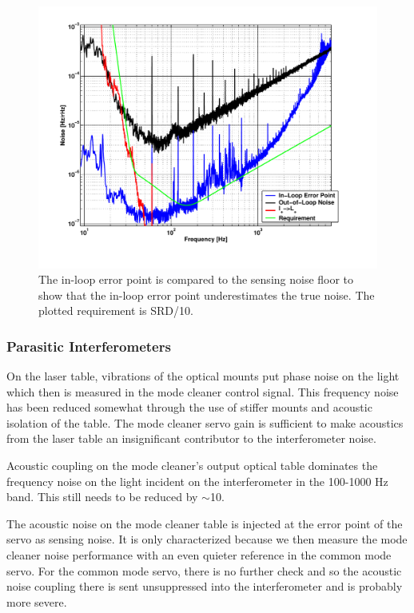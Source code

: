 \begin{figure}[!h]
\centerline{\includegraphics[angle=0,width=6.5in]{Figures/Chap5/cmnoise3b.pdf}}
\caption[Residual Frequency Noise]{The in-loop error point is compared to the
           sensing noise floor to show that the in-loop error point 
           underestimates the true noise. The plotted requirement is SRD/10.}
\label{fig:CMnoise}
\end{figure}

\subsubsection{Parasitic Interferometers}
\label{sec:CMscatter}

On the laser table, vibrations of the optical mounts put phase noise on the light
which then is measured in the mode cleaner control signal. This frequency noise
has been reduced somewhat through the use of stiffer mounts and acoustic isolation
of the table. The mode cleaner servo gain is sufficient to make acoustics from the
laser table an insignificant contributor to the interferometer noise.

Acoustic coupling on the mode cleaner's output optical table dominates the
frequency noise on the light incident on the interferometer in the 100-1000 Hz
band. This still needs to be reduced by $\sim$10.

The acoustic noise on the mode cleaner table is injected at the error point
of the servo as sensing noise. It is only characterized because we then measure the
mode cleaner noise performance with an even quieter reference in the common mode
servo. For the common mode servo, there is no further check and so the acoustic
noise coupling there is sent unsuppressed into the interferometer and is
probably more severe.

